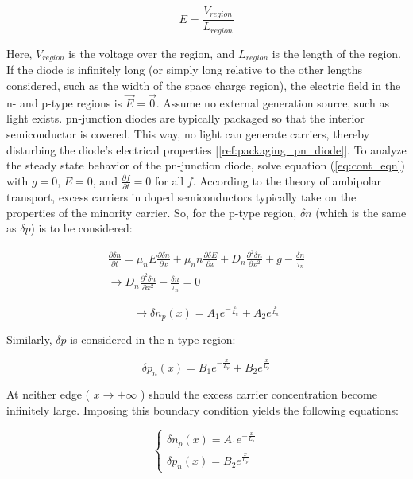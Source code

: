 \begin{equation}
	\label{eq:uniform_E}
	E = \frac{V_{region}}{L_{region}}
\end{equation}

Here, $V_{region}$ is the voltage over the region, and $L_{region}$ is the length of the region. If the diode is infinitely long (or simply long relative to the other lengths considered, such as the width of the space charge region), the electric field in the n- and p-type regions is $\vec{E} = \vec{0}$. Assume no external generation source, such as light exists. pn-junction diodes are typically packaged so that the interior semiconductor is covered. This way, no light can generate carriers, thereby disturbing the diode's electrical properties [\ref{ref:packaging_pn_diode}].
To analyze the steady state behavior of the pn-junction diode, solve equation (\ref{eq:cont_eqn}) with $g = 0$, $E = 0$, and $\frac{\partial f}{\partial t} = 0$ for all $f$. According to the theory of ambipolar transport, excess carriers in doped semiconductors typically take on the properties of the minority carrier. So, for the p-type region, $\delta n$ (which is the same as $\delta p$) is to be considered:

\begin{align*}
	\frac{\partial \delta n}{\partial t} = \mu _n E \frac{\partial \delta n}{\partial x} + \mu _n n \frac{\partial \delta E}{\partial x} + D_n \frac{\partial^2 \delta n}{\partial x^2} + g - \frac{\delta n}{\tau _n} \\
	\rightarrow D_n \frac{\partial^2 \delta n}{\partial x^2} - \frac{\delta n}{\tau _n} = 0
\end{align*}

\begin{equation}
	\label{eq:solve_cont_pn_p}
	\rightarrow \delta n_p(x) = A_1 e^{-\frac{x}{L_{n}}} + A_2 e^{\frac{x}{L_{n}}}
\end{equation}

Similarly, $\delta p$ is considered in the n-type region:

\begin{equation}
	\label{eq:solve_cont_pn_n}
	\delta p_n(x) = B_1 e^{-\frac{x}{L_{p}}} + B_2 e^{\frac{x}{L_{p}}}
\end{equation}

At neither edge ( $x \rightarrow \pm \infty$ ) should the excess carrier concentration become infinitely large. Imposing this boundary condition yields the following equations:

\begin{equation}
	\label{eq:carrier_conc}
	\begin{cases}
		\delta n_p(x) = A_1 e^{-\frac{x}{L_n}} \\
		\delta p_n(x) = B_2 e^{\frac{x}{L_p}}
	\end{cases}
\end{equation}

